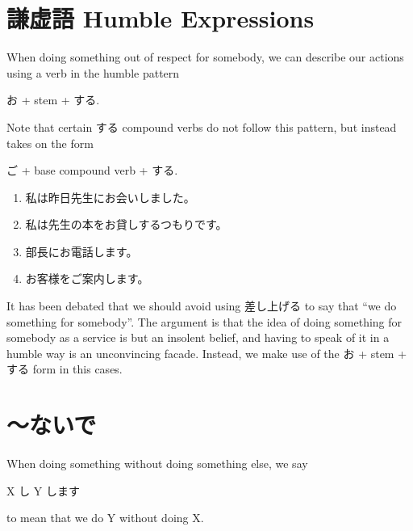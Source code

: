 \documentclass[notoc,notitlepage]{tufte-book}
\begin{document}

\section{謙虚語 Humble Expressions}%
\label{sec:kenkyogo_humble_expressions}

When doing something out of respect for somebody,
we can describe our actions using a verb in the humble pattern
\begin{center}
  お + stem + する.
\end{center}
Note that certain する compound verbs do not follow this pattern,
but instead takes on the form
\begin{center}
  ご + base compound verb + する.
\end{center}

\begin{eg}
  \begin{enumerate}
    \item 私は昨日先生にお会いしました。
    \item 私は先生の本をお貸しするつもりです。
    \item 部長にお電話します。
    \item お客様をご案内します。
  \end{enumerate}
\end{eg}

\begin{warning}
  It has been debated that we should avoid using 差し上げる
  to say that ``we do something for somebody''.
  The argument is that the idea of doing something for somebody
  as a service is but an insolent belief, and having to speak
  of it in a humble way is an unconvincing facade.
  Instead, we make use of the お + stem + する form in this cases.
\end{warning}


\section{〜ないで}%
\label{sec:_naide}

\begin{defn}[〜ないで]\label{defn:_naide}
  When doing something without doing something else,
  we say
  \begin{center}
    X し Y します
  \end{center}
  to mean that we do Y without doing X.
\end{defn}
\end{document}
